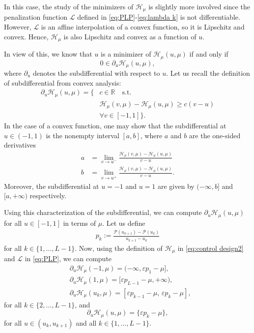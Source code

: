 \documentclass[twocolumn]{autart}    %
\begin{document}
In this case, the study of the minimizers of $\mathcal{H}_\mu$ is slightly more involved since the penalization function $\mathcal{L}$ defined in \eqref{eq:PLP}-\eqref{eq:lambda k} is not differentiable. However, $\mathcal{L}$ is an affine interpolation of a convex function, so it is Lipschitz and convex.  Hence, $\mathcal{H}_\mu$ is also Lipschitz and convex as a function of $u$. 

In view of this, we know that $u$ is a minimizer of $\mathcal{H}_\mu (u,\mu)$ if and only if
\begin{equation}\label{opti cond subdiff}
	0\in \partial_u \mathcal{H}_\mu (u,\mu),
\end{equation}
where $\partial_u$ denotes the subdifferential with respect to $u$. Let us recall the definition of subdifferential from convex analysis:
\begin{align*}
	\partial_u \mathcal{H}_\mu (u,\mu) = \{  & c\in \mathbb{R} \quad \text{s.t.} 
	\\
	&\mathcal{H}_\mu (v,\mu) - \mathcal{H}_\mu (u,\mu) \geq c(v-u) 
	\\
	& \forall v\in [-1,1] \}. 
\end{align*}
In the case of a convex function, one may show that the subdifferential at $u\in (-1,1)$ is the nonempty interval $[a,b]$, where $a$ and $b$ are the one-sided derivatives
\begin{align*}
	a &= \lim_{v\to u^-} \frac{\mathcal{H}_\mu (v,\mu) - \mathcal{H}_\mu(u,\mu)}{v-u} 
	\\[5pt]
	b &= \lim_{v\to u^+} \frac{\mathcal{H}_\mu (v,\mu) - \mathcal{H}_\mu(u,\mu)}{v-u}. 
\end{align*}
Moreover, the subdifferential at $u=-1$ and $u=1$ are given by $(-\infty, b]$ and $[a,+\infty)$ respectively.

Using this characterization of the subdifferential, we can compute $\partial_u\mathcal{H}_\mu(u,\mu)$ for all $u\in [-1,1]$ in terms of $\mu$.
Let us define
\begin{align*} 
	p_k := \frac{\mathcal{P}(u_{k+1}) - \mathcal{P} (u_k) }{u_{k+1} - u_k} 
\end{align*} 
for all $k\in \{1, \ldots, L-1\}$. Now, using the definition of $\mathcal{H}_\mu$ in \eqref{eq:control design2} and $\mathcal{L}$ in \eqref{eq:PLP}, we can compute
\begin{align*}
	&\partial_u \mathcal{H}_\mu (-1,\mu) = (-\infty, \varepsilon p_1 -\mu], 
	\\[5pt]
	&\partial_u \mathcal{H}_\mu (1,\mu) = [\varepsilon p_{L-1} -\mu, +\infty), 
	\\[5pt]
	&\partial_u \mathcal{H}_\mu (u_k,\mu) = [\varepsilon p_{k-1} -\mu,  \, \varepsilon p_k -\mu],
\end{align*}
for all $k\in \{ 2, \ldots, L-1\}$, and
\begin{equation*}
	\partial_u \mathcal{H}_\mu(u,\mu) = \{\varepsilon p_k -\mu\},
\end{equation*}
for all $u\in (u_k, u_{k+1})$ and all $k\in \{ 1, \ldots, L-1 \}$.
\end{document}
